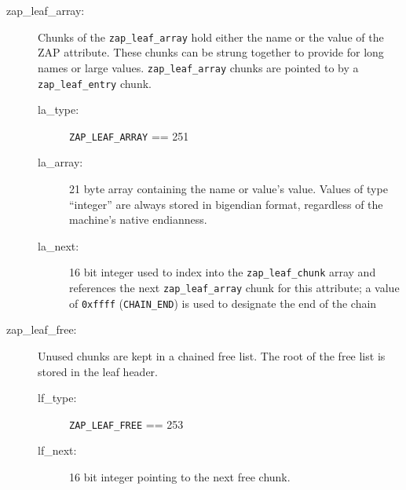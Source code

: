 \begin{description}
\item[zap\_leaf\_array:]
  Chunks of the \lstinline{zap_leaf_array} hold
  either the name or the value of the ZAP attribute.
  These chunks can be strung together to provide for long names or large values.
  \lstinline{zap_leaf_array} chunks are pointed to by a \lstinline{zap_leaf_entry} chunk.

  \begin{description}
  \item[la\_type:]
    \lstinline{ZAP_LEAF_ARRAY} == 251
  \item[la\_array:]
    21 byte array containing the name or value's value.
    Values of type ``integer'' are always stored in bigendian format,
    regardless of the machine's native endianness.
  \item[la\_next:]
    16 bit integer used to index into the \lstinline{zap_leaf_chunk} array
    and references the next \lstinline{zap_leaf_array} chunk for this attribute;
    a value of \lstinline{0xffff} (\lstinline{CHAIN_END}) is used to designate the end of the chain
  \end{description}

\item[zap\_leaf\_free:]
  Unused chunks are kept in a chained free list.
  The root of the free list is stored in the leaf header.
  \begin{description}
  \item[lf\_type:]
    \lstinline{ZAP_LEAF_FREE} == 253
  \item[lf\_next:]
    16 bit integer pointing to the next free chunk.
  \end{description}
\end{description}
